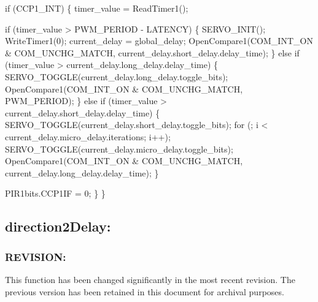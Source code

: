 \documentclass[]{article}
\begin{document}
	if (CCP1\_INT)\newline
	\{\newline
		timer\_value = ReadTimer1();\newline
		
		if (timer\_value > PWM\_PERIOD - LATENCY)\newline
		\{\newline
			SERVO\_INIT();\newline
			WriteTimer1(0);\newline
			current\_delay = global\_delay;\newline
			OpenCompare1(COM\_INT\_ON \& COM\_UNCHG\_MATCH, current\_delay.short\_delay.delay\_time);\newline
		\}\newline
		else if (timer\_value > current\_delay.long\_delay.delay\_time)\newline
		\{\newline
			SERVO\_TOGGLE(current\_delay.long\_delay.toggle\_bits);\newline
			OpenCompare1(COM\_INT\_ON \& COM\_UNCHG\_MATCH, PWM\_PERIOD); \newline
		\}\newline
		else if (timer\_value > current\_delay.short\_delay.delay\_time)\newline
		\{\newline
			SERVO\_TOGGLE(current\_delay.short\_delay.toggle\_bits);\newline
			for (; i < current\_delay.micro\_delay.iterations; i++);\newline
			SERVO\_TOGGLE(current\_delay.micro\_delay.toggle\_bits);\newline
			OpenCompare1(COM\_INT\_ON \& COM\_UNCHG\_MATCH, current\_delay.long\_delay.delay\_time);\newline
		\}\newline
		
		PIR1bits.CCP1IF = 0;\newline
	\}\newline
\}\newline

\subsection{direction2Delay:}
\subsubsection{REVISION:}
This function has been changed significantly in the most recent revision. The previous version has been retained in this document for archival purposes.
\end{document}
